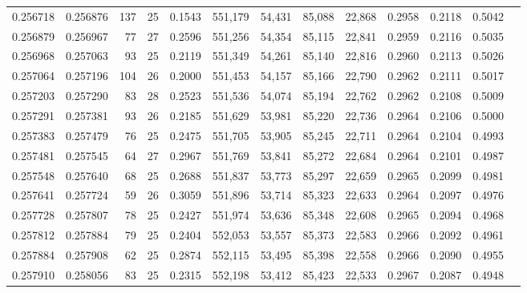 \begin{tabular}{rrrrrrrrrrrrr}
0.256718 & 0.256876 & 137 &  25 &                                     0.1543 & 551,179 &  54,431 &  85,088 &  22,868 & 0.2958 & 0.2118 & 0.5042 \\
0.256879 & 0.256967 &  77 &  27 &                                     0.2596 & 551,256 &  54,354 &  85,115 &  22,841 & 0.2959 & 0.2116 & 0.5035 \\
0.256968 & 0.257063 &  93 &  25 &                                     0.2119 & 551,349 &  54,261 &  85,140 &  22,816 & 0.2960 & 0.2113 & 0.5026 \\
0.257064 & 0.257196 & 104 &  26 &                                     0.2000 & 551,453 &  54,157 &  85,166 &  22,790 & 0.2962 & 0.2111 & 0.5017 \\
0.257203 & 0.257290 &  83 &  28 &                                     0.2523 & 551,536 &  54,074 &  85,194 &  22,762 & 0.2962 & 0.2108 & 0.5009 \\
0.257291 & 0.257381 &  93 &  26 &                                     0.2185 & 551,629 &  53,981 &  85,220 &  22,736 & 0.2964 & 0.2106 & 0.5000 \\
0.257383 & 0.257479 &  76 &  25 &                                     0.2475 & 551,705 &  53,905 &  85,245 &  22,711 & 0.2964 & 0.2104 & 0.4993 \\
0.257481 & 0.257545 &  64 &  27 &                                     0.2967 & 551,769 &  53,841 &  85,272 &  22,684 & 0.2964 & 0.2101 & 0.4987 \\
0.257548 & 0.257640 &  68 &  25 &                                     0.2688 & 551,837 &  53,773 &  85,297 &  22,659 & 0.2965 & 0.2099 & 0.4981 \\
0.257641 & 0.257724 &  59 &  26 &                                     0.3059 & 551,896 &  53,714 &  85,323 &  22,633 & 0.2964 & 0.2097 & 0.4976 \\
0.257728 & 0.257807 &  78 &  25 &                                     0.2427 & 551,974 &  53,636 &  85,348 &  22,608 & 0.2965 & 0.2094 & 0.4968 \\
0.257812 & 0.257884 &  79 &  25 &                                     0.2404 & 552,053 &  53,557 &  85,373 &  22,583 & 0.2966 & 0.2092 & 0.4961 \\
0.257884 & 0.257908 &  62 &  25 &                                     0.2874 & 552,115 &  53,495 &  85,398 &  22,558 & 0.2966 & 0.2090 & 0.4955 \\
0.257910 & 0.258056 &  83 &  25 &                                     0.2315 & 552,198 &  53,412 &  85,423 &  22,533 & 0.2967 & 0.2087 & 0.4948 \\

\end{tabular}
